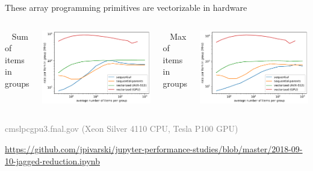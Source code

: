 \documentclass[aspectratio=169]{beamer}
\begin{document}
\begin{frame}{These array programming primitives are vectorizable in hardware}
\large
\vspace{0.5 cm}
\begin{columns}
\mbox{ } \hfill Sum of items in groups \hfill \mbox{ }

\includegraphics[width=\linewidth]{sum_rates_logy.pdf}

\mbox{ } \hfill Max of items in groups \hfill \mbox{ }

\includegraphics[width=\linewidth]{max_rates_logy.pdf}
\end{columns}

\vspace{0.5 cm}
\normalsize
\textcolor{gray}{cmslpcgpu3.fnal.gov (Xeon Silver 4110 CPU, Tesla P100 GPU)}

\vspace{0.25 cm}
\textcolor{blue}{\small\url{https://github.com/jpivarski/jupyter-performance-studies/blob/master/2018-09-10-jagged-reduction.ipynb}}
\end{frame}
\end{document}
